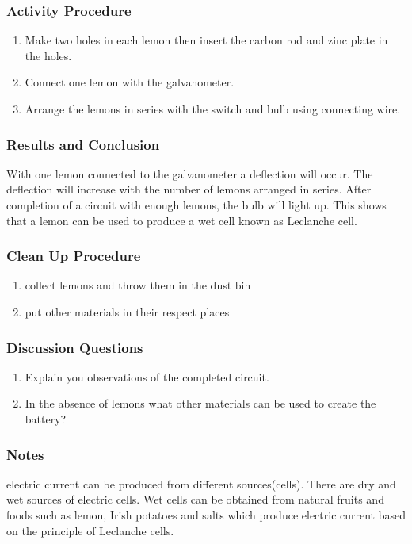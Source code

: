 \subsubsection*{Activity Procedure}
\begin{enumerate}
\item{Make two holes in each lemon then insert the carbon rod and zinc plate in the holes.} 
\item{Connect one lemon with the galvanometer.}
\item{Arrange the lemons in series with the switch and bulb using connecting wire.} 
\end{enumerate}

\subsubsection*{Results and Conclusion}
With one lemon connected to the galvanometer a deflection will occur. The deflection will increase with the number of lemons arranged in series. After completion of a circuit with enough lemons, the bulb will light up. This shows that a lemon can be used to produce a wet cell known as Leclanche cell.  

\subsubsection*{Clean Up Procedure}
\begin{enumerate}
\item{collect lemons and throw them in the dust bin}
\item{put other materials in their respect places}
\end{enumerate}

\subsubsection*{Discussion Questions}
\begin{enumerate}
\item{Explain you observations of the completed circuit.}
\item{In the absence of lemons what other materials can be used to create the battery?} 
\end{enumerate}

\subsubsection*{Notes}
electric current can be produced from different sources(cells). There are dry and wet sources of electric cells. Wet cells can be obtained from natural fruits and foods such as lemon, Irish potatoes and salts which produce electric current based on the principle of Leclanche cells.  


